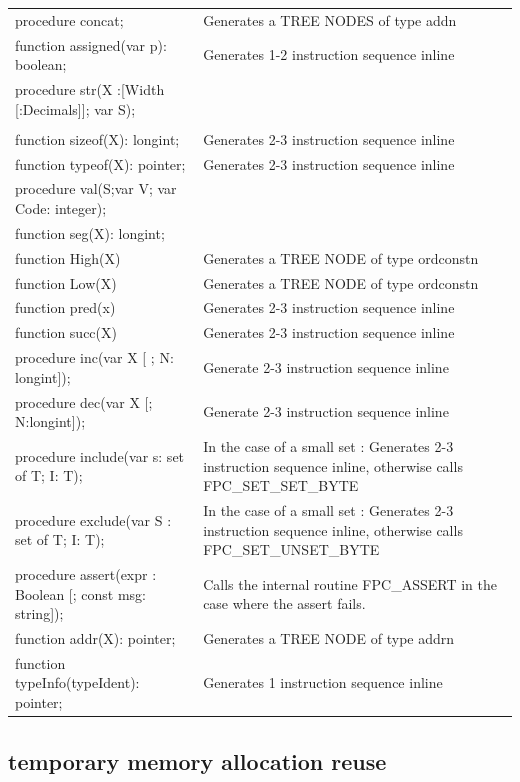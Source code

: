 \documentclass [12pt]{article}
\begin{document}
\begin{longtable}{|l|p{7cm}|}
\textsf{procedure concat;}& 
   Generates a TREE NODES of type addn \\
\textsf{function assigned(var p): boolean;}& 
   Generates 1-2 instruction sequence inline \\
\textsf{procedure str(X :[Width [:Decimals]]; var S);}& \\
\textsf{}&  \\
\textsf{function sizeof(X): longint;}& 
   Generates 2-3 instruction sequence inline \\
\textsf{function typeof(X): pointer;}& 
   Generates 2-3 instruction sequence inline \\
\textsf{procedure val(S;var V; var Code: integer);}& \\
\textsf{function seg(X): longint;}& \\
\textsf{function High(X)}& 
   Generates a TREE NODE of type ordconstn \\
\textsf{function Low(X)}& 
   Generates a TREE NODE of type ordconstn \\
\textsf{function pred(x)}& 
   Generates 2-3 instruction sequence inline \\
\textsf{function succ(X)}& 
   Generates 2-3 instruction sequence inline \\
\textsf{procedure inc(var X [ ; N: longint]);}& 
   Generate 2-3 instruction sequence inline \\
\textsf{procedure dec(var X [; N:longint]);}& 
   Generate 2-3 instruction sequence inline \\
\textsf{procedure include(var s: set of T; I: T);}& 
   In the case of a small set : Generates 2-3 instruction sequence inline,
   otherwise calls FPC{\_}SET{\_}SET{\_}BYTE \\
\textsf{procedure exclude(var S : set of T; I: T);}& 
   In the case of a small set : Generates 2-3 instruction sequence inline,
   otherwise calls FPC{\_}SET{\_}UNSET{\_}BYTE \\
\textsf{procedure assert(expr : Boolean [; const msg: string]);}& 
  Calls the internal routine FPC{\_}ASSERT in the case where the assert fails.\\
\textsf{function addr(X): pointer;}& 
  Generates a TREE NODE of type addrn \\
\textsf{function typeInfo(typeIdent): pointer;}& 
  Generates 1 instruction sequence inline \\
\end{longtable}

\subsection{temporary memory allocation reuse}
\label{subsec:mylabel11}
\end{document}
